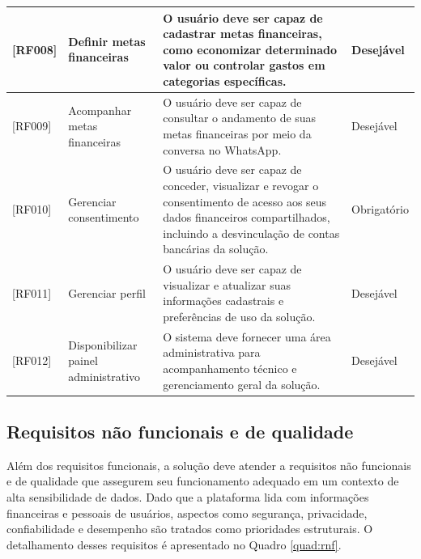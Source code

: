 \begin{longtable}{|p{1.5cm}|p{3.2cm}|p{7.3cm}|p{2.1cm}|}
    {[RF008]} & Definir metas financeiras & O usuário deve ser capaz de cadastrar metas financeiras, como economizar determinado valor ou controlar gastos em categorias específicas. & Desejável \\ \hline
    {[RF009]} & Acompanhar metas financeiras & O usuário deve ser capaz de consultar o andamento de suas metas financeiras por meio da conversa no WhatsApp. & Desejável \\ \hline
    {[RF010]} & Gerenciar consentimento & O usuário deve ser capaz de conceder, visualizar e revogar o consentimento de acesso aos seus dados financeiros compartilhados, incluindo a desvinculação de contas bancárias da solução. & Obrigatório \\ \hline
    {[RF011]} & Gerenciar perfil & O usuário deve ser capaz de visualizar e atualizar suas informações cadastrais e preferências de uso da solução. & Desejável \\ \hline
    {[RF012]} & Disponibilizar painel administrativo & O sistema deve fornecer uma área administrativa para acompanhamento técnico e gerenciamento geral da solução. & Desejável \\ \hline
\end{longtable}

\subsection{Requisitos não funcionais e de qualidade}

Além dos requisitos funcionais, a solução deve atender a requisitos não funcionais e de qualidade que assegurem seu funcionamento adequado em um contexto de alta sensibilidade de dados. Dado que a plataforma lida com informações financeiras e pessoais de usuários, aspectos como segurança, privacidade, confiabilidade e desempenho são tratados como prioridades estruturais. O detalhamento desses requisitos é apresentado no Quadro \ref{quad:rnf}.

